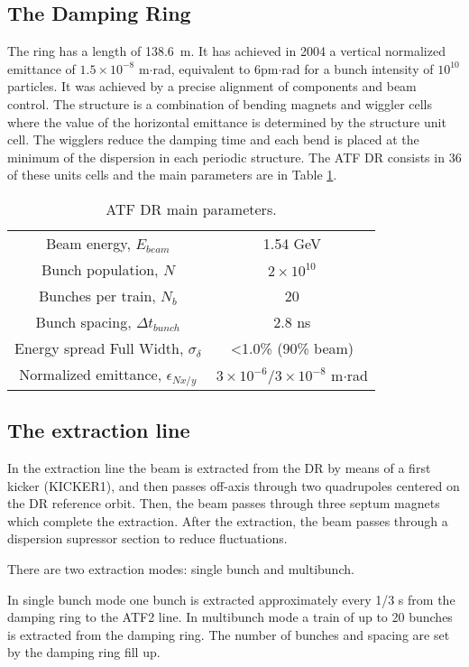 {{\subsection{The Damping Ring}
The ring has a length of 138.6~m. It has achieved in 2004 a vertical normalized emittance of $1.5\times10^{-8}$ m$\cdot$rad, equivalent to $6$pm$\cdot$rad for a bunch intensity of $10^{10}$ particles. It was achieved by a precise alignment of components and beam control. The structure is a combination of bending magnets and wiggler cells where the value of the horizontal emittance is determined by the structure unit cell. The wigglers reduce the damping time and each bend is placed at the minimum of the dispersion in each periodic structure. The ATF DR consists in 36 of these units cells and the main parameters are in Table \ref{t:ATFDR}.
\begin{table}[hbt]
\centering
 \begin{tabular}{|c|c|}\hline
 Beam energy, $E_{beam}$& 1.54 GeV \\
 Bunch population, $N$& $2\times10^{10}$ \\
 Bunches per train, $N_b$ & 20 \\
 Bunch spacing, $\Delta t_{bunch}$ & 2.8 ns\\
 Energy spread Full Width, $\sigma_\delta$ & <1.0\% (90\% beam)\\
 Normalized emittance, $\epsilon_{Nx/y}$ & $3\times 10^{-6}/3\times 10^{-8}$ m$\cdot$rad\\\hline 
 \end{tabular}\caption{ATF DR main parameters.}\label{t:ATFDR}
\end{table}
\subsection{The extraction line}
In the extraction line the beam is extracted from the DR by means of a first kicker (KICKER1), and then passes off-axis through two quadrupoles centered on the DR reference orbit. Then, the beam passes through three septum magnets which complete the extraction. After the extraction, the beam passes through a dispersion supressor section to reduce fluctuations.\par
There are two extraction modes: single bunch and multibunch.\par
In single bunch mode one bunch is extracted approximately every 1/3 s from the damping ring to the ATF2 line. In multibunch mode a train of up to 20 bunches is extracted from the damping ring. The number of bunches and spacing are set by the damping ring fill up.\par
}}
